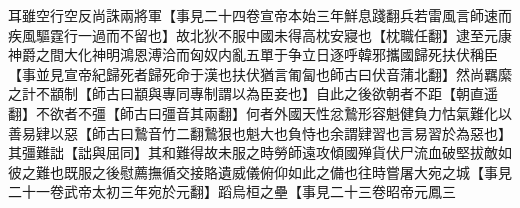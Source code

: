 耳雖空行空反尚誅兩將軍【事見二十四卷宣帝本始三年鮮息踐翻兵若雷風言師速而疾風驅霆行一過而不留也】故北狄不服中國未得高枕安寢也【枕職任翻】逮至元康神爵之間大化神明鴻恩溥洽而匈奴内亂五單于争立日逐呼韓邪攜國歸死扶伏稱臣【事並見宣帝紀歸死者歸死命于漢也扶伏猶言匍匐也師古曰伏音蒲北翻】然尚羈縻之計不顓制【師古曰顓與專同專制謂以為臣妾也】自此之後欲朝者不距【朝直遥翻】不欲者不彊【師古曰彊音其兩翻】何者外國天性忿鷙形容魁健負力怙氣難化以善易肄以惡【師古曰鷙音竹二翻鷙狠也魁大也負恃也余謂肄習也言易習於為惡也】其彊難詘【詘與屈同】其和難得故未服之時勞師遠攻傾國殚貨伏尸流血破堅拔敵如彼之難也既服之後慰薦撫循交接賂遺威儀俯仰如此之備也往時嘗屠大宛之城【事見二十一卷武帝太初三年宛於元翻】蹈烏桓之壘【事見二十三卷昭帝元鳳三